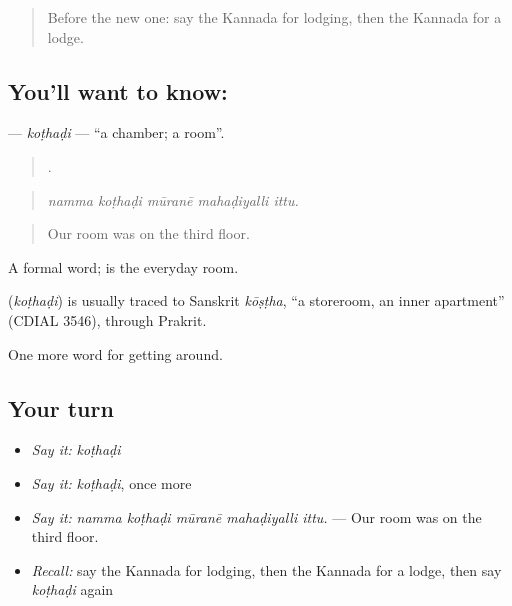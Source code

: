 \begin{quote}
Before the new one: say the Kannada for lodging, then the Kannada for a lodge.
\end{quote}

\subsection*{You'll want to know: }
\textbf{} — \emph{koṭhaḍi} — \textquotedblleft{}a chamber; a room\textquotedblright{}.

\begin{quote}
    .
\end{quote}

\begin{quote}
\emph{namma koṭhaḍi mūranē mahaḍiyalli ittu.}
\end{quote}

\begin{quote}
Our room was on the third floor.
\end{quote}

A formal word;  is the everyday room.

\begin{cousinweb}
\textbf{} (\emph{koṭhaḍi}) is usually traced to Sanskrit \emph{kōṣṭha}, \textquotedblleft{}a storeroom, an inner apartment\textquotedblright{} (CDIAL 3546), through Prakrit.
\end{cousinweb}

\begin{grammarlens}[title={What you've built}]
One more word for getting around.
\end{grammarlens}

\subsection*{Your turn}
\begin{itemize}
\raggedright
  \item \emph{Say it:} \emph{koṭhaḍi}
  \item \emph{Say it:} \emph{koṭhaḍi}, once more
  \item \emph{Say it:} \emph{namma koṭhaḍi mūranē mahaḍiyalli ittu.} — Our room was on the third floor.
  \item \emph{Recall:} say the Kannada for lodging, then the Kannada for a lodge, then say \emph{koṭhaḍi} again
\end{itemize}

